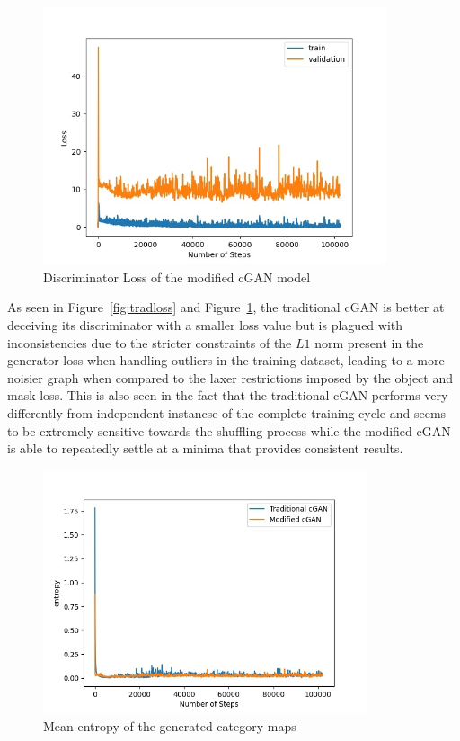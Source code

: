 \documentclass{Configuration_Files/PoliMi3i_thesis}
\begin{document}
\begin{figure}[H]
    \centering
    \includegraphics[width=0.9\textwidth]{mod_cgan_loss.jpg}
    \caption{Discriminator Loss of the modified cGAN model}
    \label{fig:modloss}
\end{figure}
As seen in Figure~\ref{fig:tradloss} and Figure~\ref{fig:modloss}, the traditional cGAN is better at deceiving its
discriminator with a smaller loss value but is plagued with inconsistencies due to the 
stricter constraints of the $L1$ norm present in the generator loss when handling 
outliers in the training dataset, leading to a more noisier graph when compared to 
the laxer restrictions imposed by the object and mask loss. This is also seen in the fact 
that the traditional cGAN performs very differently from independent instancse of the 
complete training cycle and seems to be extremely sensitive towards the shuffling 
process while the modified cGAN is able to repeatedly settle at a minima that provides 
consistent results.
\begin{figure}[H]
    \centering
    \includegraphics[width=0.85\textwidth]{entropy.jpg}
    \caption{Mean entropy of the generated category maps}
    \label{fig:entropy}
\end{figure}
\end{document}
